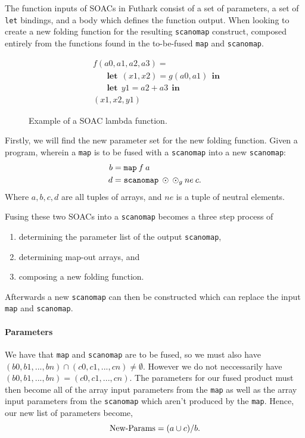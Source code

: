 \documentclass[11pt]{article}
\newcommand\lett{\phantom{-}\:\:\mathbf{let}\:\:}
\newcommand\inn{\:\:\mathbf{in}\:\:}
\begin{document}
The function inputs of SOACs in Futhark consist of a set of parameters, a set of \texttt{let} bindings, and a body which defines the function output. When
 looking to create a new folding function for the resulting \texttt{scanomap} construct, composed entirely from the functions found in the to-be-fused \texttt{map} and \texttt{scanomap}.
\begin{figure}[h!]
  \centering
  \begin{align}
    &f (a0, a1, a2, a3) = \\
    &\lett (x1,x2) = g(a0, a1) \inn \\
    &\lett y1 = a2 + a3 \inn \\
    &(x1, x2, y1)
  \end{align}
  \caption{Example of a SOAC lambda function.}
\end{figure}
Firstly, we will find the new parameter set for the new folding function. Given a program, wherein a \texttt{map} is to be fused with a \texttt{scanomap} into a new \texttt{scanomap}:
\begin{align*}
b &= \mathtt{map} \: f \: a \\
d &= \mathtt{scanomap} \: \odot \: \odot_g \: ne \: c \mathnormal{.}  
\end{align*}
Where $a, b, c, d$ are all tuples of arrays, and $ne$ is a tuple of neutral elements.

Fusing these two SOACs into a \texttt{scanomap} becomes a three step process of
\begin{enumerate}
\item determining the parameter list of the output \texttt{scanomap},
\item determining map-out arrays, and
\item composing a new folding function.
\end{enumerate}
Afterwards a new \texttt{scanomap} can then be constructed which can replace the input \texttt{map} and \texttt{scanomap}.
\paragraph{Parameters}

We have that \texttt{map} and \texttt{scanomap} are to be fused, so we must also have $(b0, b1, ...,bn) \cap (c0, c1, ..., cn) \neq \emptyset$. However
 we do not neccessarily have $(b0, b1, ...,bn) = (c0, c1, ..., cn)$. The parameters for our fused product must then become all of the array input parameters from the \texttt{map} as well as
 the array input parameters from the \texttt{scanomap} which aren't produced by the \texttt{map}. Hence, our new list of parameters become,
$$\text{New-Params} = (a \cup c) / b\mathnormal{.}$$
\end{document}
